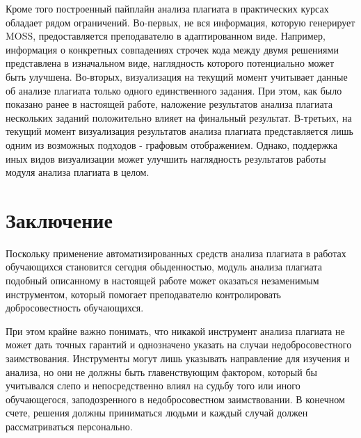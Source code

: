 \documentclass{article}
\begin{document}
Кроме того построенный пайплайн анализа плагиата в практических курсах обладает рядом ограничений. Во-первых, не вся информация, которую генерирует MOSS, предоставляется преподавателю в адаптированном виде. Например, информация о конкретных совпадениях строчек кода между двумя решениями представлена в изначальном виде, наглядность которого потенциально может быть улучшена. Во-вторых, визуализация на текущий момент учитывает данные об анализе плагиата только одного единственного задания. При этом, как было показано ранее в настоящей работе, наложение результатов анализа плагиата нескольких заданий положительно влияет на финальный результат. В-третьих, на текущий момент визуализация результатов анализа плагиата представляется лишь одним из возможных подходов - графовым отображением. Однако, поддержка иных видов визуализации может улучшить наглядность результатов работы модуля анализа плагиата в целом.

\section{Заключение}

Поскольку применение автоматизированных средств анализа плагиата в работах обучающихся становится сегодня обыденностью, модуль анализа плагиата подобный описанному в настоящей работе может оказаться незаменимым инструментом, который помогает преподавателю контролировать добросовестность обучающихся.

При этом крайне важно понимать, что никакой инструмент анализа плагиата не может дать точных гарантий и однозначено указать на случаи недобросовестного заимствования. Инструменты могут лишь указывать направление для изучения и анализа, но они не должны быть главенствующим фактором, который бы учитывался слепо и непосредственно влиял на судьбу того или иного обучающегося, заподозренного в недобросовестном заимствовании. В конечном счете, решения должны приниматься людьми и каждый случай должен рассматриваться персонально.



\end{document}
